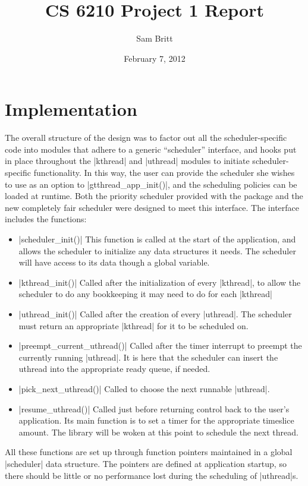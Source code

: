 \documentclass[]{article}
\title{CS 6210 Project 1 Report}
\author{Sam Britt}
\date{February 7, 2012}
\begin{document}
\maketitle

\section{Implementation}
\label{sec:implementation}

The overall structure of the design was to factor out all the
scheduler-specific code into modules that adhere to a generic
``scheduler'' interface, and hooks put in place throughout the
|kthread| and |uthread| modules to initiate scheduler-specific
functionality. In this way, the user can provide the scheduler she
wishes to use as an option to |gtthread_app_init()|, and the
scheduling policies can be loaded at runtime. Both the priority
scheduler provided with the package and the new completely fair
scheduler were designed to meet this interface. The interface includes
the functions:
\begin{itemize}
  \item |scheduler_init()| This function is called at the start of the
    application, and allows the scheduler to initialize any data
    structures it needs. The scheduler will have access to its data
    though a global variable.
  \item |kthread_init()| Called after the initialization of every
    |kthread|, to allow the scheduler to do any bookkeeping it may
    need to do for each |kthread|
  \item |uthread_init()| Called after the creation of every |uthread|.
    The scheduler must return an appropriate |kthread| for it to be
    scheduled on.
  \item |preempt_current_uthread()| Called after the timer interrupt
    to preempt the currently running |uthread|. It is here that the
    scheduler can insert the uthread into the appropriate ready queue,
    if needed.
  \item |pick_next_uthread()| Called to choose the next runnable
    |uthread|.
  \item |resume_uthread()| Called just before returning control back
    to the user's application. Its main function is to set a timer for
    the appropriate timeslice amount. The library will be woken at
    this point to schedule the next thread.
\end{itemize}
All these functions are set up through function pointers maintained in
a global |scheduler| data structure. The pointers are defined at
application startup, so there should be little or no performance lost
during the scheduling of |uthread|s.
\end{document}
